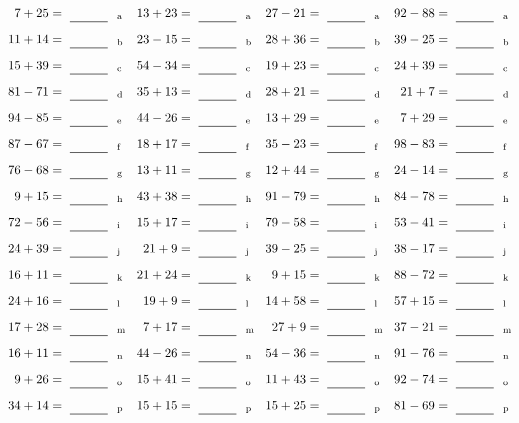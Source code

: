 \documentclass
[
  draft    = true,
  fontsize = 11pt,
  parskip  = half-
]
{scrartcl}
\begin{document}
\clearpage
\begin{align*}
    \pline{7+25}&=\rline{a}
  & \pline{13+23}&=\rline{a}
  & \pline{27-21}&=\rline{a}
  & \pline{92-88}&=\rline{a} \\[1ex]
    \pline{11+14}&=\rline{b}
  & \pline{23-15}&=\rline{b}
  & \pline{28+36}&=\rline{b}
  & \pline{39-25}&=\rline{b} \\[1ex]
    \pline{15+39}&=\rline{c}
  & \pline{54-34}&=\rline{c}
  & \pline{19+23}&=\rline{c}
  & \pline{24+39}&=\rline{c} \\[1ex]
    \pline{81-71}&=\rline{d}
  & \pline{35+13}&=\rline{d}
  & \pline{28+21}&=\rline{d}
  & \pline{21+7}&=\rline{d} \\[1ex]
    \pline{94-85}&=\rline{e}
  & \pline{44-26}&=\rline{e}
  & \pline{13+29}&=\rline{e}
  & \pline{7+29}&=\rline{e} \\[1ex]
    \pline{87-67}&=\rline{f}
  & \pline{18+17}&=\rline{f}
  & \pline{35-23}&=\rline{f}
  & \pline{98-83}&=\rline{f} \\[1ex]
    \pline{76-68}&=\rline{g}
  & \pline{13+11}&=\rline{g}
  & \pline{12+44}&=\rline{g}
  & \pline{24-14}&=\rline{g} \\[1ex]
    \pline{9+15}&=\rline{h}
  & \pline{43+38}&=\rline{h}
  & \pline{91-79}&=\rline{h}
  & \pline{84-78}&=\rline{h} \\[1ex]
    \pline{72-56}&=\rline{i}
  & \pline{15+17}&=\rline{i}
  & \pline{79-58}&=\rline{i}
  & \pline{53-41}&=\rline{i} \\[1ex]
    \pline{24+39}&=\rline{j}
  & \pline{21+9}&=\rline{j}
  & \pline{39-25}&=\rline{j}
  & \pline{38-17}&=\rline{j} \\[1ex]
    \pline{16+11}&=\rline{k}
  & \pline{21+24}&=\rline{k}
  & \pline{9+15}&=\rline{k}
  & \pline{88-72}&=\rline{k} \\[1ex]
    \pline{24+16}&=\rline{l}
  & \pline{19+9}&=\rline{l}
  & \pline{14+58}&=\rline{l}
  & \pline{57+15}&=\rline{l} \\[1ex]
    \pline{17+28}&=\rline{m}
  & \pline{7+17}&=\rline{m}
  & \pline{27+9}&=\rline{m}
  & \pline{37-21}&=\rline{m} \\[1ex]
    \pline{16+11}&=\rline{n}
  & \pline{44-26}&=\rline{n}
  & \pline{54-36}&=\rline{n}
  & \pline{91-76}&=\rline{n} \\[1ex]
    \pline{9+26}&=\rline{o}
  & \pline{15+41}&=\rline{o}
  & \pline{11+43}&=\rline{o}
  & \pline{92-74}&=\rline{o} \\[1ex]
    \pline{34+14}&=\rline{p}
  & \pline{15+15}&=\rline{p}
  & \pline{15+25}&=\rline{p}
  & \pline{81-69}&=\rline{p}
\end{align*}
\end{document}
